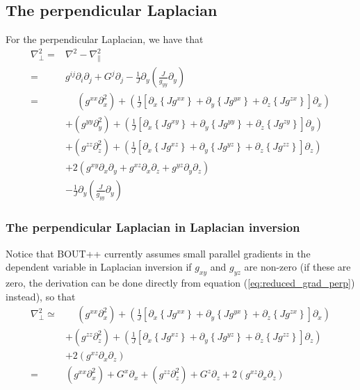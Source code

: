 \documentclass[12pt]{article}
\def\L{\left}
\def\R{\right}
\newcommand{\Grad}{\ensuremath{\nabla}}
\begin{document}
\subsection{The perpendicular Laplacian}
%
For the perpendicular Laplacian, we have that
%
\begin{align*}
    \Grad_\perp^2 =& \Grad^2 - \Grad_\|^2\\ =& g^{ij} \partial_i \partial_j +
    G^j \partial_j -\frac{1}{J} \partial_y \L(\frac{J}{g_{yy}} \partial_y\R)\\
%
            =& \quad \, \L(g^{xx} \partial_x^2\R) + \L( \frac{1}{J} \L[
\partial_x \L\{J g^{xx} \R\} + \partial_y \L\{J g^{yx} \R\} + \partial_z \L\{J
g^{zx} \R\} \R] \partial_x\R)\\ &+ \L(g^{yy} \partial_y^2\R) + \L( \frac{1}{J}
    \L[ \partial_x \L\{J g^{xy} \R\} + \partial_y \L\{J g^{yy} \R\} +
    \partial_z \L\{J g^{zy} \R\} \R] \partial_y\R)\\ &+ \L(g^{zz}
        \partial_z^2\R) + \L( \frac{1}{J} \L[ \partial_x \L\{J g^{xz} \R\} +
        \partial_y \L\{J g^{yz} \R\} + \partial_z \L\{J g^{zz} \R\} \R]
        \partial_z\R)\\ &+ 2\L( g^{xy} \partial_x \partial_y + g^{xz}
        \partial_x \partial_z + g^{yz} \partial_y \partial_z \R)\\ &-
        \frac{1}{J} \partial_y \L(\frac{J}{g_{yy}} \partial_y\R)
\end{align*}
%


\subsubsection{The perpendicular Laplacian in Laplacian inversion}
%
Notice that BOUT++ currently assumes small parallel gradients in the dependent
variable in Laplacian inversion if $g_{xy}$ and $g_{yz}$ are non-zero (if these
are zero, the derivation can be done directly from equation
(\ref{eq:reduced_grad_perp}) instead), so that
%
\begin{align*}
    \Grad_\perp^2 \simeq& \quad \, \L(g^{xx} \partial_x^2\R) + \L( \frac{1}{J}
    \L[ \partial_x \L\{J g^{xx} \R\} + \partial_y \L\{J g^{yx} \R\} +
    \partial_z \L\{J g^{zx} \R\} \R] \partial_x\R)\\ &+ \L(g^{zz}
        \partial_z^2\R) + \L( \frac{1}{J} \L[ \partial_x \L\{J g^{xz} \R\} +
        \partial_y \L\{J g^{yz} \R\} + \partial_z \L\{J g^{zz} \R\} \R]
        \partial_z\R)\\ &+ 2\L(g^{xz} \partial_x \partial_z\R)\\
%
           =& \L(g^{xx} \partial_x^2\R) + G^x\partial_x + \L(g^{zz}
        \partial_z^2\R) + G^z \partial_z + 2\L(g^{xz} \partial_x \partial_z\R)
\end{align*}
%
\end{document}
